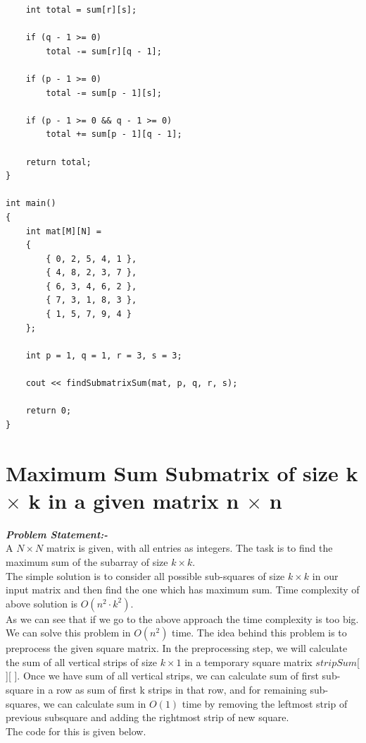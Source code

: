 \documentclass[12pt]{book}
\begin{document}
\begin{lstlisting}
    int total = sum[r][s];

    if (q - 1 >= 0)
        total -= sum[r][q - 1];

    if (p - 1 >= 0)
        total -= sum[p - 1][s];

    if (p - 1 >= 0 && q - 1 >= 0)
        total += sum[p - 1][q - 1];

    return total;
}

int main()
{
    int mat[M][N] =
    {
        { 0, 2, 5, 4, 1 },
        { 4, 8, 2, 3, 7 },
        { 6, 3, 4, 6, 2 },
        { 7, 3, 1, 8, 3 },
        { 1, 5, 7, 9, 4 }
    };

    int p = 1, q = 1, r = 3, s = 3;

    cout << findSubmatrixSum(mat, p, q, r, s);

    return 0;
}
\end{lstlisting}

\chapter{Maximum Sum Submatrix of size k $\times$ k in a given matrix n $\times$ n}

\textbf{\textit{Problem Statement:-}}\\
A $N \times N$ matrix is given, with all entries as integers. The task is to find the maximum sum of the subarray of size $k \times k$.\\

The simple solution is to consider all possible sub-squares of size $k \times k$ in our input matrix and then find the one which has maximum sum. Time complexity of above solution is $O(n^2 \cdot k^2)$.\\
As we can see that if we go to the above approach the time complexity is too big. We can solve this problem in $O(n^2)$ time. The idea behind this problem is to preprocess the given square matrix. In the preprocessing step, we will calculate the sum of all vertical strips of size $k \times 1$ in a temporary square matrix $stripSum$[ ][ ]. Once we have sum of all vertical strips, we can calculate sum of first sub-square in a row as sum of first k strips in that row, and for remaining sub-squares, we can calculate sum in $O(1)$ time by removing the leftmost strip of previous subsquare and adding the rightmost strip of new square.\\

The code for this is given below.
\end{document}
